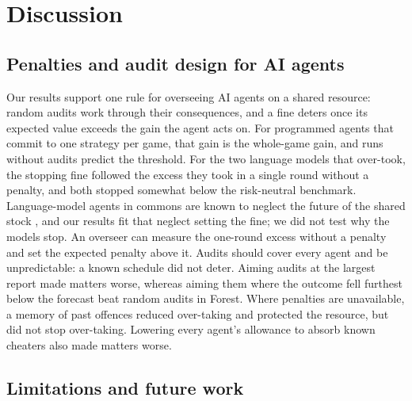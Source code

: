 \documentclass[letterpaper]{article} %
\begin{document}
\section{Discussion}

\subsection{Penalties and audit design for AI agents}

Our results support one rule for overseeing AI agents on a shared resource: random audits work through their consequences, and a fine deters once its expected value exceeds the gain the agent acts on. For programmed agents that commit to one strategy per game, that gain is the whole-game gain, and runs without audits predict the threshold. For the two language models that over-took, the stopping fine followed the excess they took in a single round without a penalty, and both stopped somewhat below the risk-neutral benchmark. Language-model agents in commons are known to neglect the future of the shared stock \citep{piatti2024cooperate,bracale2026draining}, and our results fit that neglect setting the fine; we did not test why the models stop. An overseer can measure the one-round excess without a penalty and set the expected penalty above it. Audits should cover every agent and be unpredictable: a known schedule did not deter. Aiming audits at the largest report made matters worse, whereas aiming them where the outcome fell furthest below the forecast beat random audits in Forest. Where penalties are unavailable, a memory of past offences reduced over-taking and protected the resource, but did not stop over-taking. Lowering every agent's allowance to absorb known cheaters also made matters worse.

\subsection{Limitations and future work}
\end{document}
